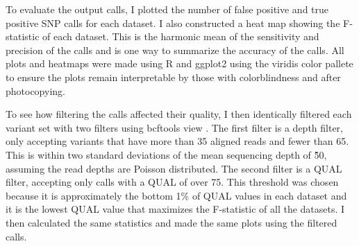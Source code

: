 To evaluate the output calls, I plotted the number of false positive and true positive SNP calls for each dataset. I also constructed a heat map showing the F-statistic of each dataset. This is the harmonic mean of the sensitivity and precision of the calls and is one way to summarize the accuracy of the calls. All plots and heatmaps were made using R \parencite{r_core_2020} and ggplot2 \parencite{wickham_ggplot2_2016} using the viridis color pallete \parencite{garnier_viridis_2018} to ensure the plots remain interpretable by those with colorblindness and after photocopying.

To see how filtering the calls affected their quality, I then identically filtered each variant set with two filters using bcftools view \parencite{li_sequence_2009}. The first filter is a depth filter, only accepting variants that have more than 35 aligned reads and fewer than 65. This is within two standard deviations of the mean sequencing depth of \~50, assuming the read depths are Poisson distributed. The second filter is a QUAL filter, accepting only calls with a QUAL of over 75. This threshold was chosen because it is approximately the bottom 1\% of QUAL values in each dataset and it is the lowest QUAL value that maximizes the F-statistic of all the datasets. I then calculated the same statistics and made the same plots using the filtered calls.



